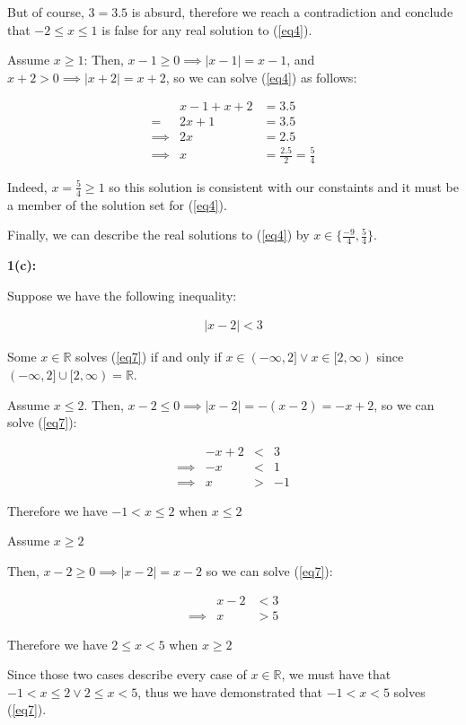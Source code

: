 \documentclass{article}
\newcommand{\reals}{\mathbb{R}}
\begin{document}
But of course, $3 = 3.5$ is absurd,
therefore we reach a contradiction
and conclude that $-2 \le x \le 1$ is false for any real solution to (\ref{eq4}).

Assume $x \geq 1$:
Then, $x-1 \geq 0 \implies |x-1| = x-1$,
and $x+2 > 0 \implies |x+2| = x+2$,
so we can solve (\ref{eq4}) as follows:

\begin{align}
	& x-1 +x+2 & = 3.5 \\
	= & 2x+1 & = 3.5 \\
	\implies & 2x & = 2.5 \\
	\label{eq6} \implies & x & = \frac{2.5}{2} = \frac{5}{4}
\end{align}

Indeed, $x = \frac{5}{4} \geq 1$ so this solution is consistent
with our constaints and it must be a member of the solution set for (\ref{eq4}).

Finally, we can describe the real solutions
to (\ref{eq4}) by $x \in \{ \frac{-9}{4}, \frac{5}{4} \}$.

\medskip
\textbf{1(c):}

Suppose we have the following inequality: 

\begin{align} \label{eq7}
	|x-2| < 3
\end{align}

Some $x \in \reals$ solves (\ref{eq7}) if and only if
$x \in (-\infty,2] \lor x \in [2, \infty)$
since $(-\infty,2] \cup [2,\infty) = \reals$.


Assume $x \le 2$.
Then, $x - 2 \le 0 \implies |x-2| = -(x-2) = -x+2$,
so we can solve (\ref{eq7}):

\begin{align}
	&-x+2 &< &3 \\
	\implies &-x &< &1 \\
	\implies &x & > &-1
\end{align}

Therefore we have $-1 < x \le 2$ when $x \le 2$

Assume $x \geq 2$

Then, $x - 2 \geq 0 \implies |x-2| = x-2$
so we can solve (\ref{eq7}):

\begin{align}
	&x-2 &< 3 \\
	\implies &x &> 5
\end{align}

Therefore we have $2 \le x < 5$ when $x \geq 2$

Since those two cases describe every case of $x \in \reals$,
we must have that $-1 < x \le 2 \lor 2 \le x < 5$,
thus we have demonstrated that $-1 < x < 5$ solves (\ref{eq7}).
\end{document}
